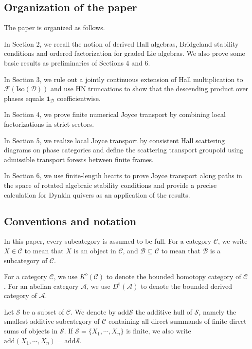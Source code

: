 \documentclass[a4paper,12pt]{amsart}
\numberwithin{equation}{section}
\newcommand{\add}{\mathrm{add}}
\newcommand{\Iso}{\mathrm{Iso}}
\newcommand{\1}{\mathbf{1}}
\begin{document}
\subsection{Organization of the paper}
The paper is organized as follows. 

In Section 2, we recall the notion of derived Hall algebras, Bridgeland stability conditions and ordered factorization for graded Lie algebras. We also prove some basic results as preliminaries of Sections 4 and 6.

In Section 3, we rule out a jointly continuous extension of Hall multiplication to $\mathscr{F}(\Iso(\mathcal{D}))$ and use HN truncations to show that the descending product over phases equals $\1_{\mathcal{D}}$ coefficientwise.

In Section 4, we prove finite numerical Joyce transport by combining local factorizations in strict sectors. 

In Section 5, we realize local Joyce transport by consistent Hall scattering diagrams on phase categories and define the scattering transport groupoid using admissible transport forests between finite frames.

In Section 6, we use finite-length hearts to prove Joyce transport along paths in the space of rotated algebraic stability conditions and provide a precise calculation for Dynkin quivers as an application of the results.

\subsection{Conventions and notation}
    In this paper, every subcategory is assumed to be full. For a category $\mathcal{C}$, we write $X\in\mathcal{C}$ to mean that $X$ is an object in $\mathcal{C}$, and $\mathcal{B}\subseteq\mathcal{C}$ to mean that $\mathcal{B}$ is a subcategory of $\mathcal{C}$.

    For a category $\mathcal{C}$, we use $K^b(\mathcal{C})$ to denote the bounded homotopy category of $\mathcal{C}$. For an abelian category $\mathcal{A}$, we use $D^b(\mathcal{A})$ to denote the bounded derived category of $\mathcal{A}$.

    Let $\mathcal{S}$ be a subset of $\mathcal{C}$. We denote by $\add\mathcal{S}$ the additive hull of $\mathcal{S}$, namely the smallest additive subcategory of $\mathcal{C}$ containing all direct summands of finite direct sums of objects in $\mathcal{S}$. If $\mathcal{S}=\{X_1,\cdots,X_n\}$ is finite, we also write $\add(X_1,\cdots,X_n)=\add\mathcal{S}$.
\end{document}
